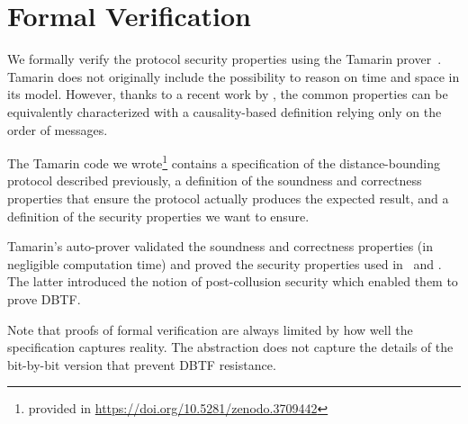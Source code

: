 \section{Formal Verification}\label{formal-verification}

We formally verify the protocol security properties using the Tamarin
prover~\cite{meier2013tamarin}. Tamarin does not originally include
the possibility to reason on time and space in its model.  However,
thanks to a recent work by \textcite{TamarinDB}, the common properties
can be equivalently characterized with a causality-based definition
relying only on the order of messages.


The Tamarin code we wrote\footnote{provided in \url{https://doi.org/10.5281/zenodo.3709442}}%
 contains a specification of the distance-bounding protocol described previously, a definition of the soundness and correctness properties that ensure the protocol actually produces the expected result, and a definition of the security properties we want to ensure.

Tamarin's auto-prover validated the soundness and correctness
properties (in negligible computation time) and proved the security
properties used in~\cite{TamarinDB} and
\textcite{TamarinDBTF}. The latter introduced the notion of post-collusion
security which enabled them to prove \ac{DBTF}. 

Note that proofs of formal verification are always limited by how well the specification captures reality. The abstraction does not capture the details of the bit-by-bit version that prevent \ac{DBTF} resistance. 



